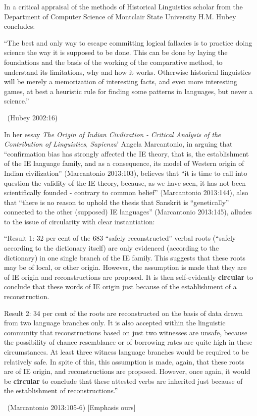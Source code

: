 In a critical appraisal of the methods of Historical Linguistics scholar from the Department of Computer Science of Montclair State University H.M. Hubey concludes:

\begin{myquote}
“The best and only way to escape committing logical fallacies is to practice doing science the way it is supposed to be done. This can be done by laying the foundations and the basis of the working of the comparative method, to understand its limitations, why and how it works. Otherwise historical linguistics will be merely a memorization of interesting facts, and even more interesting games, at best a heuristic rule for finding some patterns in languages, but never a science.” 

~\hfill (Hubey 2002:16)
\end{myquote}

In her essay \textit{The Origin of Indian Civilization - Critical Analysis of the Contribution of Linguistics}, \textit{Sapienza}’ Angela Marcantonio, in arguing that “confirmation bias has strongly affected the IE theory, that is, the establishment of the IE language family, and as a consequence, its model of Western origin of Indian civilization” (Marcantonio 2013:103), believes that “it is time to call into question the validity of the IE theory, because, as we have seen, it has not been scientifically founded - contrary to common belief” (Marcantonio 2013:144), also that “there is no reason to uphold the thesis that Sanskrit is “genetically” connected to the other (supposed) IE languages” (Marcantonio 2013:145), alludes to the issue of circularity with clear instantiation:

\begin{myquote}
“Result 1: 32 per cent of the 683 “safely reconstructed” verbal roots (“safely according to the dictionary itself) are only evidenced (according to the dictionary) in one single branch of the IE family. This suggests that these roots may be of local, or other origin. However, the assumption is made that they are of IE origin and reconstructions are proposed. It is then self-evidently \textbf{circular} to conclude that these words of IE origin just because of the establishment of a reconstruction. 
\end{myquote}

\begin{myquote}
Result 2: 34 per cent of the roots are reconstructed on the basis of data drawn from two language branches only. It is also accepted within the linguistic community that reconstructions based on just two witnesses are unsafe, because the possibility of chance resemblance or of borrowing rates are quite high in these circumstances. At least three witness language branches would be required to be relatively safe. In spite of this, this assumption is made, again, that these roots are of IE origin, and reconstructions are proposed. However, once again, it would be \textbf{circular} to conclude that these attested verbs are inherited just because of the establishment of reconstructions.”

~\hfill (Marcantonio 2013:105-6) [Emphasis ours]
\end{myquote}

